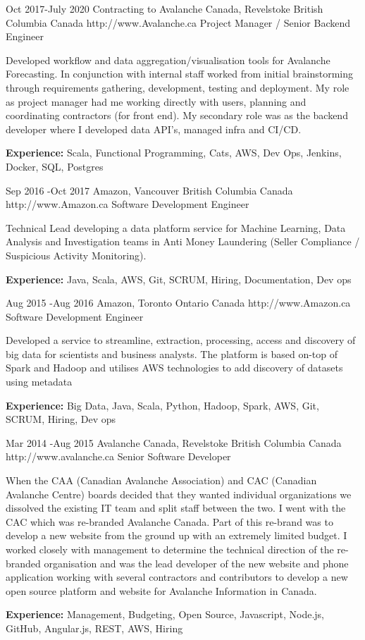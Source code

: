 \documentclass{article}
\begin{document}
\begin{job}
{Oct 2017-}{July 2020}
{Contracting to Avalanche Canada, Revelstoke British Columbia Canada}
{http://www.Avalanche.ca}
{Project Manager / Senior Backend Engineer}%
{Developed workflow and data aggregation/visualisation tools for Avalanche Forecasting. In conjunction with internal staff worked from initial brainstorming through requirements gathering, development, testing and deployment. My role as  project manager had me working directly with users, planning and coordinating contractors (for front end). My secondary role was as the backend developer where I developed data API's, managed infra and CI/CD.\\
\rule{0mm}{5mm}\textbf{Experience:} Scala, Functional Programming, Cats, AWS, Dev Ops, Jenkins, Docker, SQL, Postgres}
\end{job}

\begin{job}
{Sep 2016 -}{Oct 2017}
{Amazon, Vancouver British Columbia Canada}
{http://www.Amazon.ca}
{Software Development Engineer}%
{Technical Lead developing a data platform service for Machine Learning, Data Analysis and Investigation teams in Anti Money Laundering (Seller Compliance / Suspicious Activity Monitoring). \\
\rule{0mm}{5mm}\textbf{Experience:} Java, Scala, AWS, Git, SCRUM, Hiring, Documentation, Dev ops}
\end{job}


\begin{job}
{Aug 2015 -}{Aug 2016}
{Amazon, Toronto Ontario Canada}
{http://www.Amazon.ca}
{Software Development Engineer}%
{Developed a service to streamline, extraction, processing, access and discovery of big data for scientists and business analysts. The platform is based on-top of Spark and Hadoop and utilises AWS technologies to add discovery of datasets using metadata \\
\rule{0mm}{5mm}\textbf{Experience:} Big Data, Java, Scala, Python, Hadoop, Spark, AWS, Git, SCRUM, Hiring, Dev ops}
\end{job}

\begin{job}
{Mar 2014 -}{Aug 2015}
{Avalanche Canada, Revelstoke British Columbia Canada}
{http://www.avalanche.ca}
{Senior Software Developer}%
{When the CAA (Canadian Avalanche Association) and CAC (Canadian Avalanche Centre) boards decided that they wanted individual organizations we dissolved the existing IT team and split staff between the two. I went with the CAC which was re-branded Avalanche Canada. Part of this re-brand was to develop a new website from the ground up with an extremely limited budget. I worked closely with management to determine the technical direction of the re-branded organisation and was the lead developer of the new website and phone application working with several contractors and contributors to develop a new open source platform and website for Avalanche Information in Canada. \\
\rule{0mm}{5mm}\textbf{Experience:} Management, Budgeting, Open Source, Javascript, Node.js, GitHub, Angular.js, REST, AWS, Hiring }
\end{job}
\end{document}
